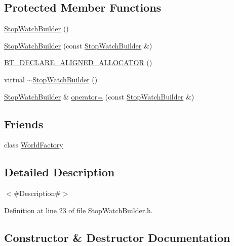 \subsection*{Protected Member Functions}
\begin{DoxyCompactItemize}
\item 
\mbox{\hyperlink{classnjli_1_1_stop_watch_builder_a7b5b92f163586f62f8d7c545f54e361a}{Stop\+Watch\+Builder}} ()
\item 
\mbox{\hyperlink{classnjli_1_1_stop_watch_builder_a0affbfac16041e1e96a30c41df34db1a}{Stop\+Watch\+Builder}} (const \mbox{\hyperlink{classnjli_1_1_stop_watch_builder}{Stop\+Watch\+Builder}} \&)
\item 
\mbox{\hyperlink{classnjli_1_1_stop_watch_builder_a1bd5b633e5412e45bd1a002163295f05}{B\+T\+\_\+\+D\+E\+C\+L\+A\+R\+E\+\_\+\+A\+L\+I\+G\+N\+E\+D\+\_\+\+A\+L\+L\+O\+C\+A\+T\+OR}} ()
\item 
virtual \mbox{\hyperlink{classnjli_1_1_stop_watch_builder_ad73828ec0de3915b40c5c9532229bcf3}{$\sim$\+Stop\+Watch\+Builder}} ()
\item 
\mbox{\hyperlink{classnjli_1_1_stop_watch_builder}{Stop\+Watch\+Builder}} \& \mbox{\hyperlink{classnjli_1_1_stop_watch_builder_ad3650557eb0211a3630c68582fef4721}{operator=}} (const \mbox{\hyperlink{classnjli_1_1_stop_watch_builder}{Stop\+Watch\+Builder}} \&)
\end{DoxyCompactItemize}
\subsection*{Friends}
\begin{DoxyCompactItemize}
\item 
class \mbox{\hyperlink{classnjli_1_1_stop_watch_builder_acb96ebb09abe8f2a37a915a842babfac}{World\+Factory}}
\end{DoxyCompactItemize}


\subsection{Detailed Description}
$<$\#\+Description\#$>$ 

Definition at line 23 of file Stop\+Watch\+Builder.\+h.



\subsection{Constructor \& Destructor Documentation}
\mbox{\label{classnjli_1_1_stop_watch_builder_a7b5b92f163586f62f8d7c545f54e361a}} 
